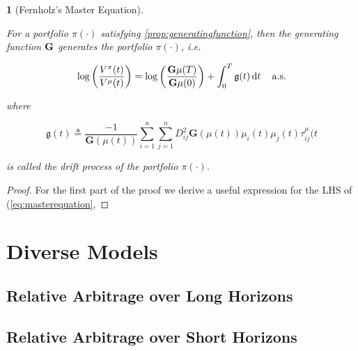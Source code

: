 \documentclass[british]{amsart} \usepackage{lmodern}
\numberwithin{equation}{section} \numberwithin{figure}{section}
\theoremstyle{plain} \newtheorem{thm}{\protect\theoremname}[section]
\theoremstyle{definition} \newtheorem{defn}[thm]{\protect\definitionname}
\theoremstyle{plain} \newtheorem{assumption}[thm]{\protect\assumptionname}
\theoremstyle{plain} \newtheorem{lem}[thm]{\protect\lemmaname}
\theoremstyle{plain} \newtheorem{prop}[thm]{\protect\propositionname}
\theoremstyle{remark} \newtheorem{rem}[thm]{\protect\remarkname}
\theoremstyle{plain} \newtheorem{cor}[thm]{\protect\corollaryname}
\renewcommand{\d}[1]{\mathop{\mathrm{d}{#1}}}
\begin{document}
\begin{lem} [Fernholz's Master Equation]
  \label{thm:masterequation}

  For a portfolio $\pi(\cdot)$ satisfying \ref{prop:generatingfunction}, then the
  generating function $\mathbf{G}$ generates the portfolio $\pi(\cdot)$, i.e.

  \begin{equation}
    \label{eq:masterequation}
    \log \left( \frac{V^{\pi}(t)}{V^{\mu}(t)} \right) = 
    \log \left( \frac{\mathbf{G}\mu(T)}{\mathbf{G}\mu(0)} \right) + 
      \int_{0}^{T} \mathfrak{g}(t)\d{t}
    \quad \almostsurely
  \end{equation}

  where 

  \begin{equation}
    \mathfrak{g}(t) \triangleq \frac{-1}{\mathbf{G}(\mu(t))}
        \sum_{i=1}^{n} \sum_{j=1}^{n} D_{ij}^{2} \mathbf{G}(\mu(t)) 
        \mu_{i}(t) \mu_{j}(t)
        \tau_{ij}^{\mu}(t
  \end{equation}

  is called the \textit{drift process} of the portfolio $\pi(\cdot)$.

\end{lem}

\begin{proof}

  For the first part of the proof we derive a useful expression for the LHS of
  (\ref{eq:masterequation}, 


\end{proof}


\section{Diverse Models}

\subsection{Relative Arbitrage over Long Horizons}

\subsection{Relative Arbitrage over Short Horizons}

\end{document}
